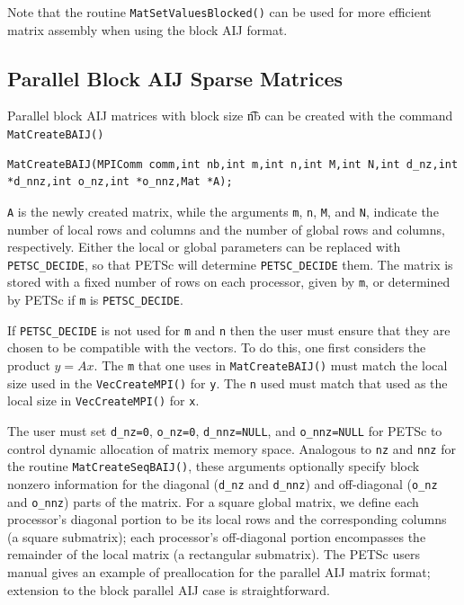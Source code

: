 Note that the routine \lstinline{MatSetValuesBlocked()}
can be used for more efficient matrix assembly
when using the block AIJ format.

\subsection{Parallel Block AIJ Sparse Matrices}

Parallel block AIJ matrices with block size {\t nb} can be created with
the command \lstinline{MatCreateBAIJ()}
\begin{lstlisting}
MatCreateBAIJ(MPIComm comm,int nb,int m,int n,int M,int N,int d_nz,int *d_nnz,int o_nz,int *o_nnz,Mat *A);
\end{lstlisting}
\lstinline{A} is the newly created matrix, while the arguments \lstinline{m}, \lstinline{n},
\lstinline{M}, and \lstinline{N}, indicate the number of local rows and columns and
the number of global rows and columns, respectively. Either the local or
global parameters can be replaced with \lstinline{PETSC_DECIDE}, so that
PETSc will determine \lstinline{PETSC_DECIDE} them.
The matrix is stored with a fixed number of rows on
each processor, given by \lstinline{m}, or determined by PETSc if \lstinline{m} is
\lstinline{PETSC_DECIDE}.

If \lstinline{PETSC_DECIDE} is not used for
\lstinline{m} and \lstinline{n} then the user must ensure that they are chosen to be
compatible with the vectors. To do this, one first considers the product
$y = A x$. The \lstinline{m} that one uses in \lstinline{MatCreateBAIJ()}
must match the local size used in the \lstinline{VecCreateMPI()} for \lstinline{y}.
The \lstinline{n} used must match that used as the local size in
\lstinline{VecCreateMPI()} for \lstinline{x}.

The user must set \lstinline{d_nz=0}, \lstinline{o_nz=0}, \lstinline{d_nnz=NULL}, and
\lstinline{o_nnz=NULL} for PETSc to control dynamic allocation of matrix
memory space.  Analogous to \lstinline{nz} and \lstinline{nnz} for the routine
\lstinline{MatCreateSeqBAIJ()}, these arguments optionally specify
block nonzero information for the diagonal (\lstinline{d_nz} and \lstinline{d_nnz}) and
off-diagonal (\lstinline{o_nz} and \lstinline{o_nnz}) parts of the matrix.
For a square global matrix, we define each processor's diagonal portion
to be its local rows and the corresponding columns (a square submatrix);
each processor's off-diagonal portion encompasses the remainder of the
local matrix (a rectangular submatrix).
The PETSc users manual gives an example of preallocation for
the parallel AIJ matrix format; extension to the block parallel AIJ case
is straightforward.


